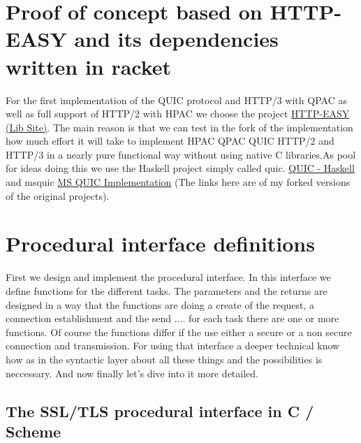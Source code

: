\documentclass[10pt,a4paper,english]{article}
\begin{document}
\begin{multicols}{2}
\section{Proof of concept based on HTTP-EASY and its dependencies written in racket}
\begin{flushleft}
For the first implementation of the QUIC protocol and HTTP/3 with QPAC as well as full support of HTTP/2 with HPAC we choose the  project \href{https://pkgs.racket-lang.org/package/http-easy-lib}{HTTP-EASY (Lib Site)}. The main reason is that we can test in the fork of the implementation how much effort it will take to implement HPAC QPAC QUIC HTTP/2 and HTTP/3 in a nearly pure functional way without using native C libraries.\newline As pool for ideas doing this we use the Haskell project simply called quic. \href{https://github.com/hglabplh-tech/quic.git}{QUIC - Haskell} and msquic  \href{https://github.com/hglabplh-tech/msquic.git}{MS QUIC Implementation}   (The links here are of my forked versions of the original projects).
\end{flushleft}

\section{Procedural interface definitions}
\begin{flushleft}
First we design and implement the procedural interface. In this interface we define functions for the different tasks. The parameters and the returns are designed in a way that  the functions are doing a create of the request, a connection establishment and the send .... for each task there  are  one or more functions. Of course the functions differ if the use either a secure or a non secure connection and transmission. For using that interface a deeper technical know how as in the syntactic layer about all these things and the possibilities is   neccessary.
And now finally let's dive into it more detailed.
\end{flushleft}
\subsection{The SSL/TLS procedural interface in C / Scheme}

\end{multicols}
\end{document}
